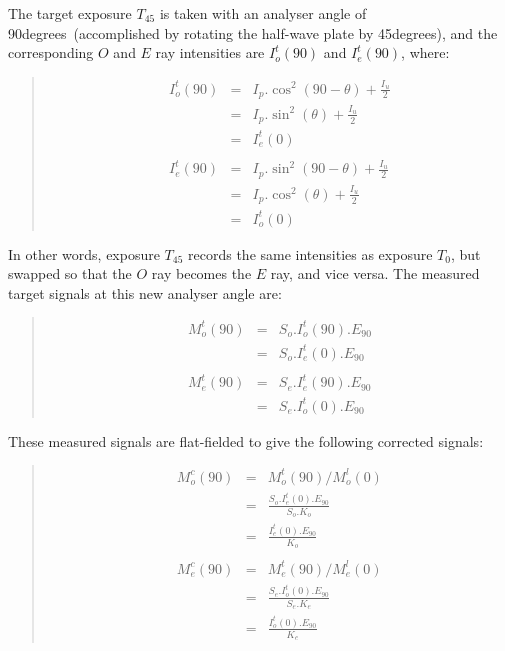 \documentclass[twoside,11pt]{article}
\renewcommand{\_}{\texttt{\symbol{95}}}
\newenvironment{myquote}{\begin{quote}\begin{small}}{\end{small}\end{quote}}
\newcommand{\dgs}{\hbox{$^\circ$}}
\renewcommand{\dgs}{degrees}
\begin{document}
The target exposure $T_{45}$ is taken with an analyser angle of 90\dgs\
(accomplished by rotating the half-wave plate by 45\dgs), and the
corresponding $O$ and $E$ ray intensities are $I^{t}_{o}(90)$ and
$I^{t}_{e}(90)$, where:

\begin{myquote}
\begin{eqnarray*}
  I^{t}_{o}(90) & = & I_{p}.\cos^{2}( 90 - \theta ) + \frac{I_{u}}{2} \\
                 & = & I_{p}.\sin^{2}( \theta ) + \frac{I_{u}}{2} \\
                 & = & I^{t}_{e}(0) \\ \\
  I^{t}_{e}(90) & = & I_{p}.\sin^{2}( 90 - \theta ) + \frac{I_{u}}{2} \\
                 & = & I_{p}.\cos^{2}( \theta ) + \frac{I_{u}}{2} \\
                 & = & I^{t}_{o}(0) 
\end{eqnarray*}
\end{myquote}

In other words, exposure $T_{45}$ records the same intensities as
exposure $T_{0}$, but swapped so that the $O$ ray becomes the
$E$ ray, and vice versa. The measured target signals at this new
analyser angle are:

\begin{myquote}
\begin{eqnarray*}
  M^{t}_{o}(90) & = & S_{o}.I^{t}_{o}(90).E_{90} \\
                & = & S_{o}.I^{t}_{e}(0).E_{90} \\ \\
  M^{t}_{e}(90) & = & S_{e}.I^{t}_{e}(90).E_{90} \\
                & = & S_{e}.I^{t}_{o}(0).E_{90} 
\end{eqnarray*}
\end{myquote}

These measured signals are flat-fielded to give the following corrected
signals:

\begin{myquote}
\begin{eqnarray*}
  M^{c}_{o}(90) & = & M^{t}_{o}(90) / M^{l}_{o}(0) \\
                & = & \frac{ S_{o}.I^{t}_{e}(0).E_{90} }{ S_{o}.K_{o} } \\
                & = & \frac{ I^{t}_{e}(0).E_{90} }{ K_{o} } \\ \\
  M^{c}_{e}(90) & = & M^{t}_{e}(90) / M^{l}_{e}(0) \\
                & = & \frac{ S_{e}.I^{t}_{o}(0).E_{90} }{ S_{e}.K_{e} } \\
                & = & \frac{ I^{t}_{o}(0).E_{90} }{ K_{e} } 
\end{eqnarray*}
\end{myquote}
\end{document}
